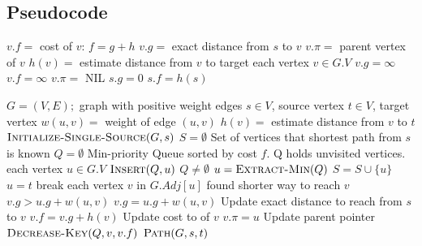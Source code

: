 \documentclass{article}
\begin{document}
\subsection{Pseudocode}
\begin{codebox}
\li \Comment $v.f = $ cost of $v$: $f = g + h$
\li \Comment $v.g = $ exact distance from $s$ to $v$
\li \Comment $v.\pi = $ parent vertex of $v$
\li \Comment $h(v) = $ estimate distance from $v$ to target
\li
\li \For each vertex $v \in G.V$
\li     \Do
            $v.g = \infty$
\li         $v.f = \infty$ 
\li         $v.\pi =$ NIL
        \End
\li $s.g = 0$
\li $s.f = h(s)$
\end{codebox}

\begin{codebox}
\li \Comment $G = (V,E);$ graph with positive weight edges
\li \Comment $s \in V$, source vertex
\li \Comment $t \in V$, target vertex
\li \Comment $w(u,v) = $ weight of edge $(u,v)$
\li \Comment $h(v) = $ estimate distance from $v$ to $t$  
\li
\li $\textsc{Initialize-Single-Source}(G,s)$
\li $S = \emptyset$ \hspace{0.5cm}\Comment Set of vertices that shortest path from $s$ is known  
\li $Q = \emptyset$ \hspace{0.5cm}\Comment Min-priority Queue sorted by cost $f$.
\li                 \hspace{1.5cm}\Comment Q holds unvisited vertices.
\li \For each vertex $u \in G.V$
\li     \Do
            $\textsc{Insert}(Q,u)$
        \End
\li \While $Q \neq \emptyset$
\li     \Do
            $u = \textsc{Extract-Min}(Q)$
\li         $S = S \cup \{u\}$
\li     \If $u = t$
\li         \Do 
                break 
\li         \End
\li     \For each vertex $v$ in $G.Adj[u]$
\li         \Do
                \Comment found shorter way to reach $v$
\li             \If $v.g > u.g + w(u,v)$
\li                 \Do
                        $v.g = u.g + w(u,v)$    \hspace{0.5cm}\Comment Update exact                    distance to reach from $s$ to $v$
\li                     $v.f = v.g + h(v)$      \hspace{0.9cm}\Comment Update cost to                                               of $v$ 
\li                     $v.\pi = u$             \hspace{2.2cm}\Comment Update parent pointer
\li                     $\textsc{Decrease-Key}(Q,v,v.f)$
                    \End
            \End
        \End
\li
\li \Return $\textsc{Path}(G,s,t)$
\end{codebox}
\end{document}
